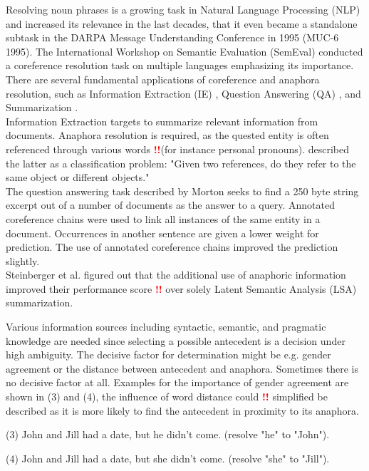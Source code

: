 Resolving noun phrases is a growing task in Natural Language Processing (NLP) and increased its relevance in the last decades, that it even became a standalone subtask in the DARPA Message Understanding Conference in 1995 (MUC-6 1995). The International Workshop on Semantic Evaluation (SemEval) conducted a coreference resolution task on multiple languages \citep{recasens2010semeval} emphasizing its importance. 
There are several fundamental applications of coreference and anaphora resolution, such as Information Extraction (IE) \citep{mccarthy1995using}, Question Answering (QA) \citep{morton2000coreference}, and Summarization \citep{steinberger2007two}.\\ 
Information Extraction targets to summarize relevant information from documents. Anaphora resolution is required, as the quested entity is often referenced through various words \textcolor{red}{\textbf{!!}}(for instance personal pronouns). \citep{mccarthy1995using} described the latter as a classification problem: "Given two references, do they refer to the same object or different objects."\\
The question answering task described by Morton seeks to find a 250 byte string excerpt out of a number of documents as the answer to a query. Annotated coreference chains were used to link all instances of the same entity in a document. Occurrences in another sentence are given a lower weight for prediction. The use of annotated coreference chains improved the prediction slightly.\\
Steinberger et al. figured out that the additional use of anaphoric information improved their performance score \textcolor{red}{\textbf{!!}} over solely Latent Semantic Analysis (LSA) summarization.

Various information sources including syntactic, semantic, and pragmatic knowledge are needed since selecting a possible antecedent is a decision under high ambiguity. The decisive factor for determination might be e.g. gender agreement or the distance between antecedent and anaphora. Sometimes there is no decisive factor at all. Examples for the importance of gender agreement are shown in (3) and (4), the influence of word distance could \textcolor{red}{\textbf{!!}} simplified be described as it is more likely to find the antecedent in proximity to its anaphora.

(3) John and Jill had a date, but he didn't come. (resolve "he" to "John").

(4) John and Jill had a date, but she didn't come. (resolve "she" to "Jill").

